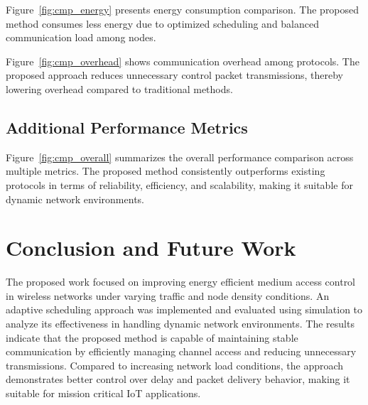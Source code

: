 \documentclass[a4paper,fleqn]{cas-dc}
\numberwithin{equation}{section}
\begin{document}
\vspace{0.3cm}


\begin{center}

\label{fig:cmp_energy}
\end{center}

Figure~\ref{fig:cmp_energy} presents energy consumption comparison. The proposed method consumes less energy due to optimized scheduling and balanced communication load among nodes.


\vspace{0.3cm}



\begin{center}

\label{fig:cmp_overhead}
\end{center}

Figure~\ref{fig:cmp_overhead} shows communication overhead among protocols. The proposed approach reduces unnecessary control packet transmissions, thereby lowering overhead compared to traditional methods.

\vspace{0.3cm}

\subsection{Additional Performance Metrics}

\begin{center}

\label{fig:cmp_overall}
\end{center}

Figure~\ref{fig:cmp_overall} summarizes the overall performance comparison across multiple metrics. The proposed method consistently outperforms existing protocols in terms of reliability, efficiency, and scalability, making it suitable for dynamic network environments.



\section{Conclusion and Future Work}
The proposed work focused on improving energy efficient medium access control in wireless networks under varying traffic and node density conditions. An adaptive scheduling approach was implemented and evaluated using simulation to analyze its effectiveness in handling dynamic network environments. The results indicate that the proposed method is capable of maintaining stable communication by efficiently managing channel access and reducing unnecessary transmissions. Compared to increasing network load conditions, the approach demonstrates better control over delay and packet delivery behavior, making it suitable for mission critical IoT applications.
\end{document}

